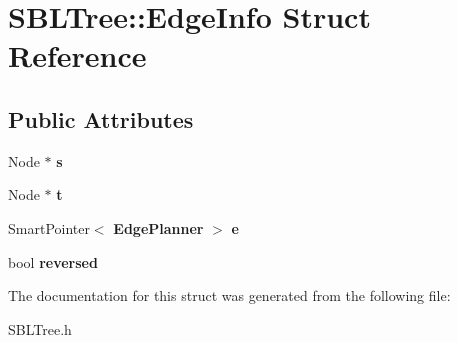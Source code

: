 \section{S\+B\+L\+Tree\+:\+:Edge\+Info Struct Reference}
\label{structSBLTree_1_1EdgeInfo}
\subsection*{Public Attributes}
\begin{DoxyCompactItemize}
\item 
Node $\ast$ {\bfseries s}\label{structSBLTree_1_1EdgeInfo_ae9ed468cb8fa8294f98b5c356b011884}

\item 
Node $\ast$ {\bfseries t}\label{structSBLTree_1_1EdgeInfo_abaf54b1bb83e819daed62fb5bcf77154}

\item 
Smart\+Pointer$<$ {\bf Edge\+Planner} $>$ {\bfseries e}\label{structSBLTree_1_1EdgeInfo_aee3fe38971af7e2cc9f0ca5fd9262526}

\item 
bool {\bfseries reversed}\label{structSBLTree_1_1EdgeInfo_a42a418024ca5cc58cde77dca8d12a688}

\end{DoxyCompactItemize}


The documentation for this struct was generated from the following file\+:\begin{DoxyCompactItemize}
\item 
S\+B\+L\+Tree.\+h\end{DoxyCompactItemize}
